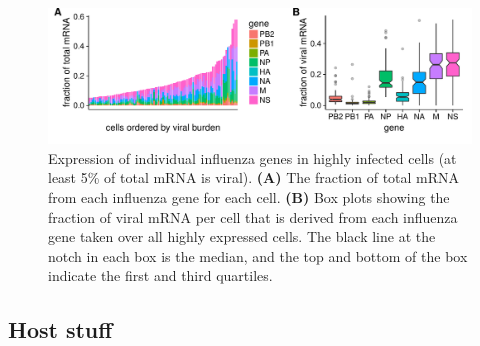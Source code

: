 \documentclass[9pt,lineno]{elife}
\begin{document}
\begin{figure}
\includegraphics[width=\linewidth]{figures/p_flu_expr.pdf}
\caption{
Expression of individual influenza genes in highly infected cells (at least 5\% of total mRNA is viral).
{\bf (A)} 
The fraction of total mRNA from each influenza gene for each cell.
{\bf (B)}
Box plots showing the fraction of viral mRNA per cell that is derived from each influenza gene taken over all highly expressed cells.
The black line at the notch in each box is the median, and the top and bottom of the box indicate the first and third quartiles.
}
\label{fig:fluexpr}
\end{figure}

\subsection{Host stuff}
\end{document}
